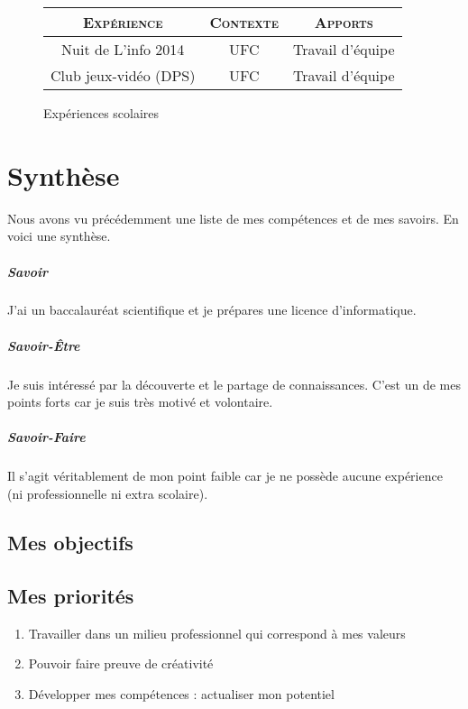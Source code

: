 \documentclass[a4paper,12pt, draft]{report}
\newcommand{\tabTitle}[1]{\hfill{} \textsc{#1} \hfill{} }
\begin{document}
\begin{figure}[h]
\begin{tabular}{|c|c|c|}
\hline
\tabTitle{Expérience}  &  \tabTitle{Contexte} & \tabTitle{Apports} \\
\hline
Nuit de L'info 2014  & UFC & Travail d'équipe \\
\hline
Club jeux-vidéo (DPS)  & UFC & Travail d'équipe \\
\hline

\end{tabular}
\caption{Expériences scolaires}
\end{figure}

\chapter{Synthèse} \label{RefSyntheseBilanPerso}
Nous avons vu précédemment une liste de mes compétences et de mes savoirs.
En voici une synthèse.

\paragraph{Savoir}
J'ai un baccalauréat scientifique et je prépares une licence d'informatique.

\paragraph{Savoir-Être}
Je suis intéressé par la découverte et le partage de connaissances. C'est un de mes points forts car je suis très motivé et volontaire.

\paragraph{Savoir-Faire}
Il s'agit véritablement de mon point faible car je ne possède aucune expérience (ni professionnelle ni extra scolaire).

\section{Mes objectifs}

\section{Mes priorités}

\begin{enumerate}
\item Travailler dans un milieu professionnel qui correspond à mes valeurs
\item Pouvoir faire preuve de créativité
\item Développer mes compétences : actualiser mon potentiel


\end{enumerate}
\end{document}
